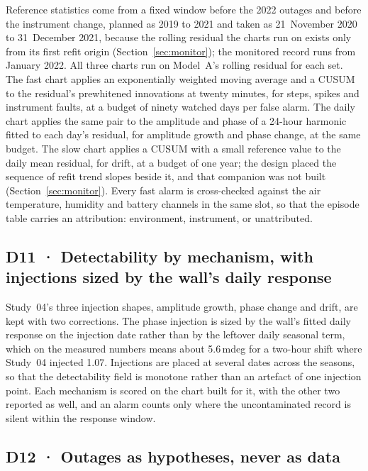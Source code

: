 \documentclass[11pt,a4paper]{article}
\begin{document}
Reference statistics come from a fixed window before the 2022 outages and
before the instrument change, planned as 2019 to 2021 and taken as
21~November 2020 to 31~December 2021, because the rolling residual the charts
run on exists only from its first refit origin (Section~\ref{sec:monitor});
the monitored record runs from January 2022. All three charts run on Model~A's
rolling residual for each set.
The fast chart applies an exponentially weighted moving average and a CUSUM to
the residual's prewhitened innovations at twenty minutes, for steps, spikes
and instrument faults, at a budget of ninety watched days per false alarm. The
daily chart applies the same pair to the amplitude and phase of a 24-hour
harmonic fitted to each day's residual, for amplitude growth and phase change,
at the same budget. The slow chart applies a CUSUM with a small reference value
to the daily mean residual, for drift, at a budget of one year; the design
placed the sequence of refit trend slopes beside it, and that companion was
not built (Section~\ref{sec:monitor}). Every fast alarm is cross-checked against the
air temperature, humidity and battery channels in the same slot, so that the
episode table carries an attribution: environment, instrument, or unattributed.

\subsection{D11 · Detectability by mechanism, with injections sized by the wall's daily response}

Study~04's three injection shapes, amplitude growth, phase change and drift,
are kept with two corrections. The phase injection is sized by the wall's
fitted daily response on the injection date rather than by the leftover daily
seasonal term, which on the measured numbers means about 5.6\,mdeg for a
two-hour shift where Study~04 injected 1.07. Injections are placed at several
dates across the seasons, so that the detectability field is monotone rather
than an artefact of one injection point. Each mechanism is scored on the chart
built for it, with the other two reported as well, and an alarm counts only
where the uncontaminated record is silent within the response window.

\subsection{D12 · Outages as hypotheses, never as data}
\end{document}
